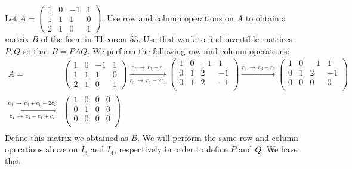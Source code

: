 \documentclass{eh-homework}
\begin{document}
    \begin{question}{1}
        Let \( A = \begin{pmatrix} 1 & 0 & -1 & 1 \\ 1 & 1 & 1 & 0 \\ 2 & 1 & 0 & 1 \end{pmatrix} \). Use row and column operations on \( A \) to obtain a matrix \( B \) of the form in Theorem 53. Use that work to find invertible matrices \( P, Q \) so that \( B = PAQ \).
        \tcblower
        We perform the following row and column operations:
        \begin{align*}
            A =
            &\begin{pmatrix}
                1 & 0 & -1 & 1 \\
                1 & 1 & 1 & 0 \\
                2 & 1 & 0 & 1
            \end{pmatrix}
            \xrightarrow[r_3\,\to\,r_3 - 2r_1]{r_2\,\to\,r_2 - r_1}
            \begin{pmatrix}
                1 & 0 & -1 &  1 \\
                0 & 1 & 2 &  -1 \\
                0 & 1 & 2 &  -1 \\
            \end{pmatrix}
            \xrightarrow{r_3\,\to\,r_3 - r_2}
            \begin{pmatrix}
                1 & 0 & -1 &  1 \\
                0 & 1 & 2 &  -1 \\
                0 & 0 & 0 &  0 \\
            \end{pmatrix}\\
            \xrightarrow[c_4\,\to\,c_4 - c_1 + c_2]{c_3\,\to\,c_3 + c_1 - 2c_2}
            &\begin{pmatrix}
                1 & 0 & 0 &  0 \\
                0 & 1 & 0 &  0 \\
                0 & 0 & 0 &  0 \\
            \end{pmatrix}\\
        \end{align*}
        Define this matrix we obtained as \(B\). We will perform the same row and column operations above on \(I_3\) and \(I_4\), respectively in order to define \(P\) and \(Q\). We have that
        \begin{align*}

\end{align*}
\end{question}
\end{document}
